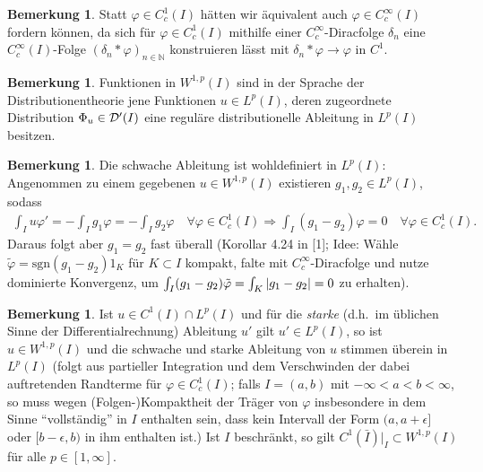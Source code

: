 \documentclass[twoside]{article}
\theoremstyle{definition}
\newtheorem{remark}[theorem]{Bemerkung}
\begin{document}
\begin{remark}
Statt $\varphi \in C_c^1(I)$ hätten wir äquivalent auch $\varphi \in C_c^\infty(I)$ fordern können, da sich für $\varphi \in C_c^1(I)$ mithilfe einer $C_c^\infty$-Diracfolge $\delta_n$ eine $ C_c^\infty(I)$-Folge $(\delta_n * \varphi)_{n \in \mathbb{N}}$ konstruieren lässt mit $\delta_n * \varphi \to \varphi$ in $C^1$.
\end{remark}
\begin{remark}
Funktionen in $W^{1,p}(I)$ sind in der Sprache der Distributionentheorie jene Funktionen $u \in L^p(I)$, deren zugeordnete Distribution $\Phi_u \in {\cal D}'(I)$ eine reguläre distributionelle Ableitung in $L^p(I)$ besitzen.
\end{remark}
\begin{remark}
Die schwache Ableitung ist wohldefiniert in $L^p(I)$: Angenommen zu einem gegebenen $u \in W^{1,p}(I)$ existieren $g_1,g_2 \in L^p(I)$, sodass
\begin{align*}
\int_I u \varphi' = - \int_I g_1 \varphi = - \int_I g_2 \varphi \quad \forall \varphi \in C_c^1(I) \Rightarrow \int_I (g_1 - g_2) \varphi = 0 \quad \forall \varphi \in C_c^1(I).
\end{align*}
Daraus folgt aber $g_1 = g_2$ fast überall (Korollar 4.24 in [1]; Idee: Wähle $\tilde{\varphi} = \text{sgn}(g_1-g_2)1_K$ für $K \subset I$ kompakt, falte mit $C_c^\infty$-Diracfolge und nutze dominierte Konvergenz, um $\int_I (g_1-g_2) \tilde{\varphi} = \int_K \abs{g_1-g_2} = 0$ zu erhalten).
\end{remark}
\begin{remark} \label{bem:klas}
Ist $u \in C^1(I) \cap L^p(I)$ und für die \textit{starke} (d.h.\ im üblichen Sinne der Differentialrechnung) Ableitung $u'$ gilt $u' \in L^p(I)$, so ist $u \in W^{1,p}(I)$ und die schwache und starke Ableitung von $u$ stimmen überein in $L^p(I)$ (folgt aus partieller Integration und dem Verschwinden der dabei auftretenden Randterme für $\varphi \in C_c^1(I)$; falls $I = (a,b)$ mit $-\infty < a < b < \infty$, so muss wegen (Folgen-)Kompaktheit der Träger von $\varphi$ insbesondere in dem Sinne \enquote{vollständig} in $I$ enthalten sein, dass kein Intervall der Form $(a,a+\epsilon]$ oder $[b-\epsilon,b)$ in ihm enthalten ist.) Ist $I$ beschränkt, so gilt $C^1(\bar{I})|_I \subset W^{1,p}(I)$ für alle $p \in [1,\infty]$.
\end{remark}
\end{document}
